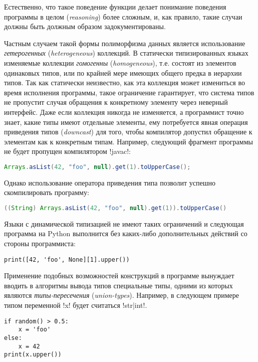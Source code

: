 Естественно, что такое поведение функции делает понимание поведения программы в
целом (\emph{reasoning}) более сложным, и, как правило, такие случаи
должны быть должным образом задокументированы. 

Частным случаем такой формы полиморфизма данных является использование
\emph{гетерогенных} (\emph{heterogeneous}) коллекций. В статически
типизированных языках изменяемые коллекции \emph{гомогенны}
(\emph{homogeneous}), т.е. состоят из элементов одинаковых типов, или по крайней
мере имеющих общего предка в иерархии типов. Так как статически неизвестно, как
эта коллекция может измениться во время исполнения программы, такое ограничение
гарантирует, что система типов не пропустит случая обращения к конкретному
элементу через неверный интерфейс. Даже если коллекция никогда не изменяется, а
программист точно знает, какие типы имеют отдельные элементы, ему потребуется
явная операция приведения типов (\emph{downcast}) для того, чтобы компилятор
допустил обращение к элементам как к конкретным типам. Например, следующий
фрагмент программы не будет пропущен компилятором !javac!:

\begin{lstlisting}[language=Java]
Arrays.asList(42, "foo", null).get(1).toUpperCase();
\end{lstlisting}

Однако использование оператора приведения типа позволит успешно скомпилировать
программу:

\begin{lstlisting}[language=Java]
((String) Arrays.asList(42, "foo", null).get(1)).toUpperCase()
\end{lstlisting}

Языки с динамической типизацией не имеют таких ограничений и следующая программа
на Python выполнится без каких-либо дополнительных действий со стороны
программиста:

\begin{lstlisting}
print([42, 'foo', None][1].upper())
\end{lstlisting}

Применение подобных возможностей конструкций в программе вынуждает вводить в
алгоритмы вывода типов специальные типы, одними из которых являются
\emph{типы-пересечения} (\emph{union-types}).  Например, в следующем примере типом
переменной !x! будет считаться !str|int!.

\begin{lstlisting}
if random() > 0.5:
    x = 'foo'
else:
    x = 42
print(x.upper())
\end{lstlisting}

